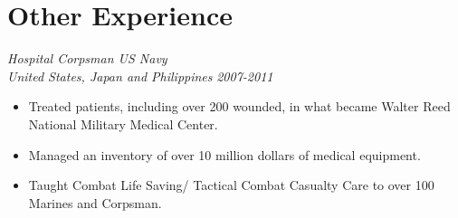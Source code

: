 \documentclass[letterpaper]{article}
\begin{document}
%
%

\vspace{.05in}
\section*{Other Experience}
\begin{multicols}{2}
\textit{Hospital Corpsman US Navy
\\United States, Japan and Philippines}
\vfill
\columnbreak
\textit{2007-2011}
\end{multicols}
\begin{itemize}
    \item Treated patients, including over 200 wounded, in what became Walter Reed National Military Medical Center.
    \item Managed an inventory of over 10 million dollars of medical equipment.
    \item Taught Combat Life Saving/ Tactical Combat Casualty Care to over 100 Marines and Corpsman. 
\end{itemize}
\end{document}
